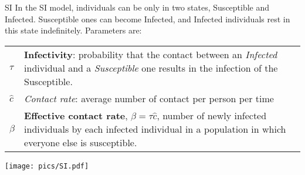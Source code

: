 \begin{textbox}{SI}
    In the SI model, individuals can be only in two states, Susceptible and Infected. Susceptible ones can become Infected, and Infected individuals rest in this state indefinitely. Parameters are:

    \begin{tabular}{p{}|p{}}\scriptsize

        $\tau$    & \textbf{Infectivity}: probability that the contact between an \textit{Infected} individual and a \textit{Susceptible} one results in the infection of the Susceptible.        \\
        $\hat{c}$ & \textit{Contact rate}: average number of contact per person per time                                                                                                          \\
        $\beta$   & \textbf{Effective contact rate}, $\beta=\tau\hat{c}$, number of newly infected individuals by each infected individual in a population in which everyone else is susceptible.
    \end{tabular}


    \centering
    \vspace{0.3cm}
    \texttt{[image: pics/SI.pdf]}
\end{textbox}



